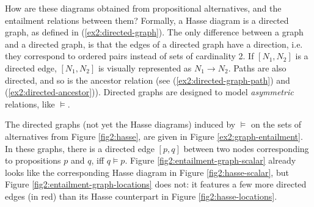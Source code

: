 How are these diagrams obtained from propositional alternatives, and the entailment relations between them? Formally, a Hasse diagram is a directed graph, as defined in (\ref{ex2:directed-graph}). The only difference between a graph and a directed graph, is that the edges of a directed graph have a direction, i.e. they correspond to ordered pairs instead of sets of cardinality 2. If $[N_1, N_2]$ is a directed edge, $[N_1, N_2]$ is visually represented as $N_1 \rightarrow N_2$. Paths are also directed, and so is the ancestor relation (see (\ref{ex2:directed-graph-path}) and (\ref{ex2:directed-ancestor})). Directed graphs are designed to model \textit{asymmetric} relations, like $\vDash$.

\begin{exe}
	\label{ex2:directed-graph}
	\label{ex2:directed-graph-path}
	\label{ex2:directed-ancestor}
\end{exe}

The directed graphs (not yet the Hasse diagrams) induced by $\vDash$ on the sets of alternatives from Figure \ref{fig2:hasse}, are given in Figure \ref{ex2:graph-entailment}. In these graphs, there is a directed edge $[p, q]$ between two nodes corresponding to propositions $p$ and $q$, iff $q \vDash p$. Figure \ref{fig2:entailment-graph-scalar} already looks like the corresponding Hasse diagram in Figure \ref{fig2:hasse-scalar}, but Figure  \ref{fig2:entailment-graph-locations} does not: it features a few more directed edges (in red) than its Hasse counterpart in Figure \ref{fig2:hasse-locations}.

